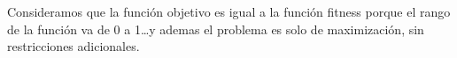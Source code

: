 Consideramos que la función objetivo es igual a la función fitness porque el rango de la función va de 0 a 1\dots y ademas el problema es solo de maximización, sin restricciones adicionales.